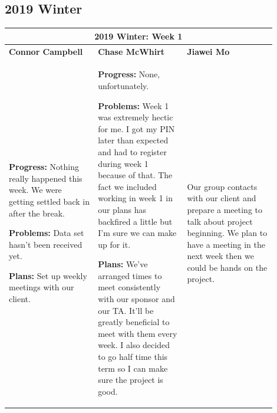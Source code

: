 \documentclass[10pt,journal,compsoc, draftclsnofoot,onecolumn]{IEEEtran}
\begin{document}
\subsection{2019 Winter}
\begin{center}
\begin{tabular}{|p{0.3\linewidth}|p{0.3\linewidth}|p{0.3\linewidth}|}
\hline
\multicolumn{3}{|c|}{\textbf{2019 Winter: Week 1}} \\
\hline
\textbf{Connor Campbell} & \textbf{Chase McWhirt} & \textbf{Jiawei Mo} \\ [0.5ex]
\hline\hline
\textbf{Progress:} Nothing really happened this week. We were getting settled back in after the break.

\textbf{Problems:} Data set hasn't been received yet.

\textbf{Plans:} Set up weekly meetings with our client.
&
\textbf{Progress:} None, unfortunately.

\textbf{Problems:} Week 1 was extremely hectic for me.
I got my PIN later than expected and had to register during week 1 because of that.
The fact we included working in week 1 in our plans has backfired a little but I'm sure we can make up for it.

\textbf{Plans:} We've arranged times to meet consistently with our sponsor and our TA.
It'll be greatly beneficial to meet with them every week.
I also decided to go half time this term so I can make sure the project is good.
&
Our group contacts with our client and prepare a meeting to talk about project beginning. We plan to have a meeting in the next week then we could be hands on the project. 
\\ \hline
\end{tabular}
\end{center}
\end{document}
